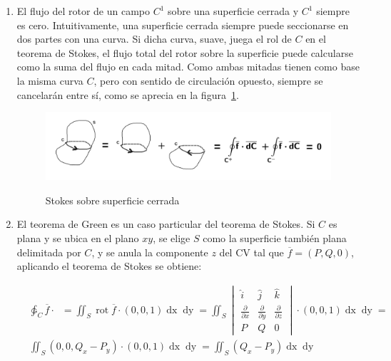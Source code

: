 \documentclass{article}
\begin{document}
\begin{enumerate}
\item El flujo del rotor de un campo $C^1$ sobre una superficie cerrada y $C^1$ siempre es cero. Intuitivamente, una superficie cerrada siempre puede seccionarse en dos partes con una curva. Si dicha curva, suave, juega el rol de $C$ en el teorema de Stokes, el flujo total del rotor sobre la superficie puede calcularse como la suma del flujo en cada mitad. Como ambas mitadas tienen como base la misma curva $C$, pero con sentido de circulación opuesto, siempre se cancelarán entre sí, como se aprecia en la figura~\ref{fig:stokes2}.

\begin{figure}[ht]
\centering
\caption{Stokes sobre superficie cerrada}
\includegraphics[scale=0.7]{img/teoremas/stokes_sup_cerrada.png}
\label{fig:stokes2}
\end{figure}

\item El teorema de Green es un caso particular del teorema de Stokes. Si $C$ es plana y se ubica en el plano $xy$, se elige $S$ como la superficie también plana delimitada por $C$, y se anula la componente $z$ del CV tal que $\overline{f} = (P, Q, 0)$, aplicando el teorema de Stokes se obtiene:

\begin{subequations}
\begin{align}
& \ointctrclockwise_C \overline{f} \cdot \mathop{\overline{dC}} = \iint_S \mathop{rot} \overline{f} \cdot (0,0,1) \mathop{dx} \mathop{dy} = \iint_S \begin{vmatrix}
\hat{i} & \hat{j} & \hat{k} \\
\frac{\partial}{\partial x} & \frac{\partial}{\partial y} & \frac{\partial}{\partial z} \\
P & Q & 0
\end{vmatrix} \cdot (0,0,1) \mathop{dx} \mathop{dy} = \\
& \iint_S (0, 0, Q_x - P_y) \cdot (0,0,1) \mathop{dx} \mathop{dy} = \iint_S (Q_x - P_y) \mathop{dx} \mathop{dy} 
\end{align}
\end{subequations}


\end{enumerate}
\end{document}
